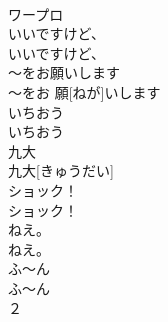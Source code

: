 \documentclass[8pt]{extreport}
\begin{document}
\begin{CJK}{UTF8}{min}
\\	ワープロ		
\\	いいですけど、	
\\	いいですけど、		
\\	〜をお願いします	
\\	〜をお 願[ねが]いします		
\\	いちおう	
\\	いちおう		
\\	九大	
\\	九大[きゅうだい]		
\\	ショック！	
\\	ショック！		
\\	ねえ。	
\\	ねえ。		
\\	ふ〜ん	
\\	ふ〜ん		
\\	[えむ]２		
\end{CJK}
\end{document}
